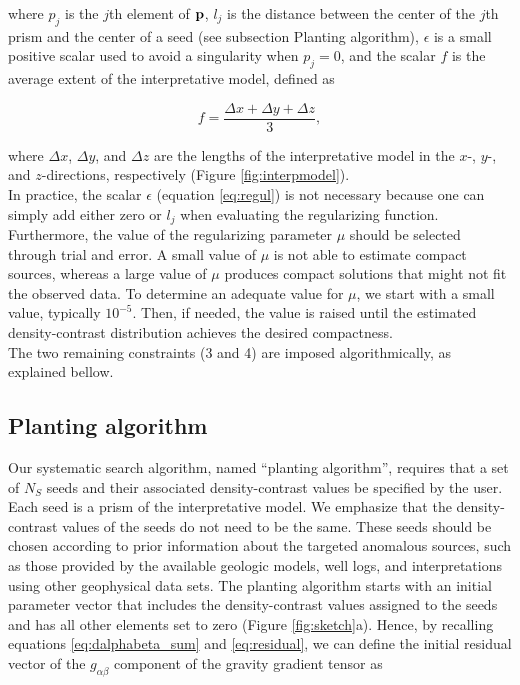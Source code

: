 \noindent
where $p_j$ is the $j$th element of $\mathbf{p}$, $l_j$ is the distance between
the center of the $j$th prism and the center of a seed
(see subsection Planting algorithm), $\epsilon$ is a small positive
scalar used to avoid a singularity when
$p_j=0$, and the scalar $f$ is the average extent of the interpretative model,
defined as

\begin{equation}
f = \frac{\Delta x + \Delta y + \Delta z}{3},
\label{eq:f}
\end{equation}

\noindent
where $\Delta x$, $\Delta y$, and $\Delta z$ are
the lengths of the interpretative model
in the $x$-, $y$-, and $z$-directions, respectively
(Figure \ref{fig:interpmodel}).
\\ \indent
In practice, the scalar $\epsilon$ (equation \ref{eq:regul}) is not
necessary because one can simply add
either zero or $l_j$ when evaluating the regularizing function.
Furthermore, the value of the regularizing parameter
$\mu$ should be selected through trial and error. 
A small value of $\mu$ is not able to estimate compact sources, whereas a large
value of $\mu$ produces compact solutions that might not fit the observed data.
To determine an adequate value for $\mu$, we start with a small value,
typically $10^{-5}$.
Then, if needed, the value is raised until the estimated
density-contrast distribution achieves the desired compactness.
\\
\indent
The two remaining constraints (3 and 4) are imposed algorithmically, as
explained bellow.

\subsection{Planting algorithm}

Our systematic search algorithm, named ``planting algorithm'', requires
that a set of $N_S$ seeds and their associated density-contrast values be
specified by the user.
Each seed is a prism of the interpretative model.
We emphasize that the density-contrast values of the seeds do not need to be
the same.
These seeds should be chosen according to prior information about
the targeted anomalous sources, such as those provided by the available
geologic models, well logs, and interpretations using other geophysical data
sets.
The planting algorithm starts with an initial
parameter vector that includes the density-contrast values assigned to the seeds
and has all other elements set to zero (Figure \ref{fig:sketch}a).
Hence, by recalling equations 
\ref{eq:dalphabeta_sum} and \ref{eq:residual}, we
can define the initial residual vector of the $g_{\alpha\beta}$ component
of the gravity gradient tensor as

